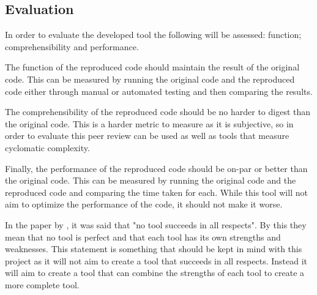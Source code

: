 \subsection{Evaluation}

In order to evaluate the developed tool the following will be assessed: function; comprehensibility and performance.

The function of the reproduced code should maintain the result of the original code. This can be measured by running the original code and the reproduced code either through manual or automated testing and then comparing the results.

The comprehensibility of the reproduced code should be no harder to digest than the original code. This is a harder metric to measure as it is subjective, so in order to evaluate this peer review can be used as well as tools that measure cyclomatic complexity.

Finally, the performance of the reproduced code should be on-par or better than the original code. This can be measured by running the original code and the reproduced code and comparing the time taken for each. While this tool will not aim to optimize the performance of the code, it should not make it worse.

In the paper by \cite{8681007}, it was said that "no tool succeeds in all respects". By this they mean that no tool is perfect and that each tool has its own strengths and weaknesses. This statement is something that should be kept in mind with this project as it will not aim to create a tool that succeeds in all respects. Instead it will aim to create a tool that can combine the strengths of each tool to create a more complete tool.
